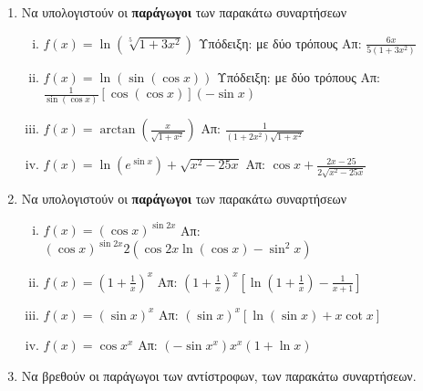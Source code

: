 \documentclass[a4paper,table]{report}
\begin{document}
\begin{center}
  \minibox{\large \bfseries \textcolor{Col1}{Ασκήσεις στις Παραγώγους}}
\end{center}

\vspace{\baselineskip}

\begin{enumerate}

  \item Να υπολογιστούν οι \textbf{παράγωγοι} των παρακάτω συναρτήσεων
    \begin{enumerate}[(i)]
      \item $ f(x) = \ln{(\sqrt[5]{1+3x^{2}})} $ \quad
        \textcolor{Col1}{Υπόδειξη:} με δύο τρόπους
        \hfill Απ: $ \frac{6x}{5(1+3x^{2})} $
      \item $ f(x) = \ln({\sin({\cos{x}})}) $ \quad 
        \textcolor{Col1}{Υπόδειξη:} με δύο τρόπους \hfill Απ: $
        \frac{1}{\sin{(\cos{x})}} [\cos{(\cos{x})}] (- \sin{x}) $ 
      \item $ f(x) = \arctan{\left(\frac{x}{\sqrt{1 + x^{2}}}\right)} $ \hfill Απ: $
        \frac{1}{(1+2x^{2})\sqrt{1 + x^{2}}} $
      \item $ f(x) = \ln{(e^{\sin{x}})} + \sqrt{x^{2} - 25x} $ \hfill Απ: $
        \cos{x} + \frac{2x - 25}{2 \sqrt{x^{2} - 25x}}  $  
    \end{enumerate}

  \item  Να υπολογιστούν οι \textbf{παράγωγοι} των παρακάτω συναρτήσεων

    \begin{enumerate}[(i)]
      \item $ f(x) = (\cos{x})^{\sin{2x}} $ \hfill Απ: $
        (\cos{x})^{\sin{2x}} 2(\cos{2x} \ln{(\cos{x})} - \sin^{2}{x}) $
      \item $ f(x) = \left(1 + \frac{1}{x} \right)^{x} $ \hfill Απ: $
        \left(1 + \frac{1}{x}\right)^{x}\left[\ln{(1 + \frac{1}{x})} -
        \frac{1}{x+1}\right] $
      \item $ f(x)=(\sin{x})^{x} $ \hfill Απ: $ (\sin{x})^{x}[\ln{(\sin{x}
        )} + x \cot{x}] $ 
      \item $ f(x)=\cos{x}^{x} $ \hfill Απ: $ (- \sin{x^{x}})x^{x} (1 +
        \ln{x}) $
    \end{enumerate}

  \item Να βρεθούν οι παράγωγοι των αντίστροφων, των παρακάτω συναρτήσεων.


\end{enumerate}
\end{document}
